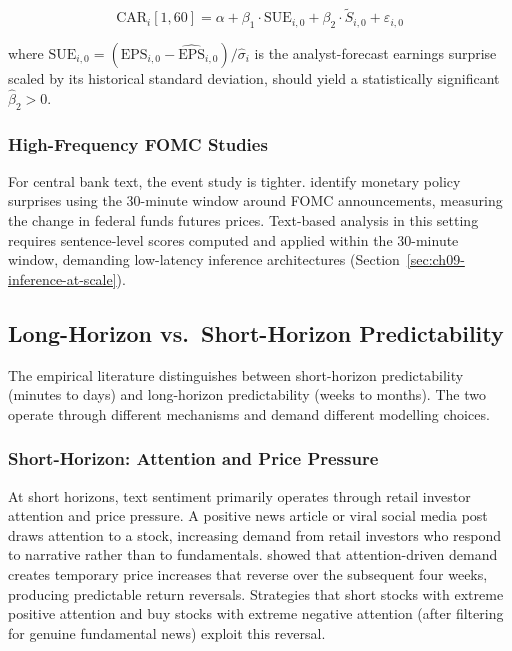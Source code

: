 \begin{equation}
  \label{eq:sentiment-predictive-regression}
  \mathrm{CAR}_{i}[1,60] = \alpha + \beta_1 \cdot \mathrm{SUE}_{i,0} + \beta_2 \cdot \tilde{S}_{i,0} + \varepsilon_{i,0}
\end{equation}

where $\mathrm{SUE}_{i,0} = (\mathrm{EPS}_{i,0} - \widehat{\mathrm{EPS}}_{i,0})/\hat{\sigma}_i$ is the analyst-forecast earnings surprise scaled by its historical standard deviation, should yield a statistically significant $\hat{\beta}_2 > 0$.

\subsubsection*{High-Frequency FOMC Studies}

For central bank text, the event study is tighter. \citet{nakamura2018high} identify monetary policy surprises using the 30-minute window around FOMC announcements, measuring the change in federal funds futures prices. Text-based analysis in this setting requires sentence-level scores computed and applied within the 30-minute window, demanding low-latency inference architectures (Section~\ref{sec:ch09-inference-at-scale}).

\subsection{Long-Horizon vs.\ Short-Horizon Predictability}
\label{sec:ch09-horizon-predictability}

The empirical literature distinguishes between short-horizon predictability (minutes to days) and long-horizon predictability (weeks to months). The two operate through different mechanisms and demand different modelling choices.

\subsubsection*{Short-Horizon: Attention and Price Pressure}

At short horizons, text sentiment primarily operates through retail investor attention and price pressure. A positive news article or viral social media post draws attention to a stock, increasing demand from retail investors who respond to narrative rather than to fundamentals. \citet{da2015sum} showed that attention-driven demand creates temporary price increases that reverse over the subsequent four weeks, producing predictable return reversals. Strategies that short stocks with extreme positive attention and buy stocks with extreme negative attention (after filtering for genuine fundamental news) exploit this reversal.

